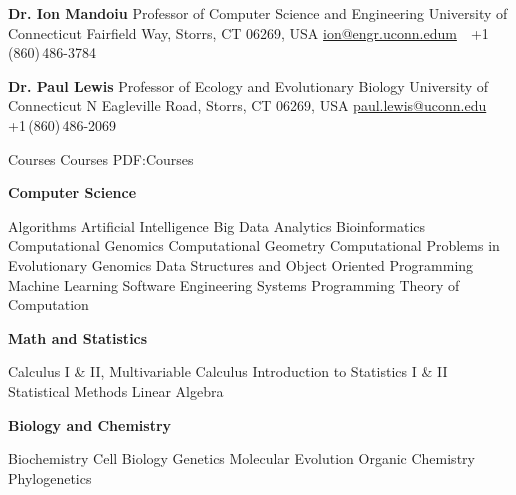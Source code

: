 \documentclass[letterpaper,MMMyyyy,nonstopmode]{simpleresumecv}
\begin{document}
\begin{Body}
\BigGap
\BulletItem
\textbf{Dr. Ion Mandoiu}
\newline
Professor of Computer Science and Engineering
\newline
University of Connecticut
 Fairfield Way, Storrs, CT 06269, USA
\newline
\href{mailto:ion@engr.uconn.edu}
{ion@engr.uconn.edum}
\,\SubBulletSymbol\,
+1\,(860)\,486-3784

\BigGap
\BulletItem
\textbf{Dr. Paul Lewis}
\newline
Professor of Ecology and Evolutionary Biology
\newline
University of Connecticut
 N Eagleville Road, Storrs, CT 06269, USA
\newline
\href{mailto:paul.lewis@uconn.edu}
{paul.lewis@uconn.edu}
\,\SubBulletSymbol\,
+1\,(860)\,486-2069


\Section
{Courses}
{Courses}
{PDF:Courses}

\Entry
\BulletItem
\textbf{Computer Science}
\begin{Detail}
\SubBulletItem Algorithms
\SubBulletItem Artificial Intelligence
\SubBulletItem Big Data Analytics
\SubBulletItem Bioinformatics
\SubBulletItem Computational Genomics
\SubBulletItem Computational Geometry
\SubBulletItem Computational Problems in Evolutionary Genomics
\SubBulletItem Data Structures and Object Oriented Programming
\SubBulletItem Machine Learning
\SubBulletItem Software Engineering
\SubBulletItem Systems Programming
\SubBulletItem Theory of Computation
\Gap
\end{Detail}

\BulletItem
\textbf{Math and Statistics}
\begin{Detail}
\SubBulletItem Calculus I \& II, Multivariable Calculus
\SubBulletItem Introduction to Statistics I \& II
\SubBulletItem Statistical Methods
\SubBulletItem Linear Algebra
\Gap
\end{Detail}

\BulletItem
\textbf{Biology and Chemistry}
\begin{Detail}
\SubBulletItem Biochemistry
\SubBulletItem Cell Biology
\SubBulletItem Genetics
\SubBulletItem Molecular Evolution
\SubBulletItem Organic Chemistry
\SubBulletItem Phylogenetics
\end{Detail}




\end{Body}
\end{document}
